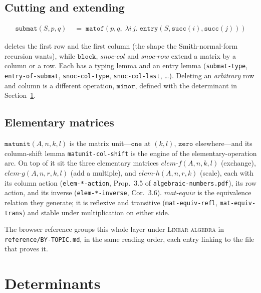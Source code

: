 \subsection{Cutting and extending}

\begin{align*}
\mathtt{submat}(S, p, q) &\;=\;
  \mathtt{matof}(p, q,\; \lambda i\, j.\;
    \mathtt{entry}(S, \mathtt{succ}(i), \mathtt{succ}(j)))
\end{align*}

\noindent
deletes the first row and the first column (the shape the Smith-normal-form
recursion wants), while $\mathtt{block}$, $\mathit{snoc\text{-}col}$ and
$\mathit{snoc\text{-}row}$ extend a matrix by a column or a row.  Each has a
typing lemma and an entry lemma (\texttt{submat-type},
\texttt{entry-of-submat}, \texttt{snoc-col-type}, \texttt{snoc-col-last},
\dots).  Deleting an \emph{arbitrary} row and column is a different
operation, $\mathtt{minor}$, defined with the determinant in
Section~\ref{sec:determinant}.

\subsection{Elementary matrices}

$\mathtt{matunit}(A, n, k, l)$ is the matrix unit---$\mathtt{one}$ at
$(k,l)$, $\mathtt{zero}$ elsewhere---and its column-shift lemma
\texttt{matunit-col-shift} is the engine of the elementary-operation
arc.  On top of it sit the three elementary matrices
$\mathit{elem\text{-}f}(A,n,k,l)$ (exchange), $\mathit{elem\text{-}g}(A,n,r,k,l)$
(add a multiple), and $\mathit{elem\text{-}h}(A,n,r,k)$ (scale), each with
its column action (\texttt{elem-*-action}, Prop.~3.5 of
\texttt{algebraic-numbers.pdf}), its row action, and its inverse
(\texttt{elem-*-inverse}, Cor.~3.6).  $\mathit{mat\text{-}equiv}$ is the
equivalence relation they generate; it is reflexive and transitive
(\texttt{mat-equiv-refl}, \texttt{mat-equiv-trans}) and stable under
multiplication on either side.

\begin{remark}
The browser reference groups this whole layer under \textsc{Linear
algebra} in \texttt{reference/BY-TOPIC.md}, in the same reading order,
each entry linking to the file that proves it.
\end{remark}

\section{Determinants}
\label{sec:determinant}

